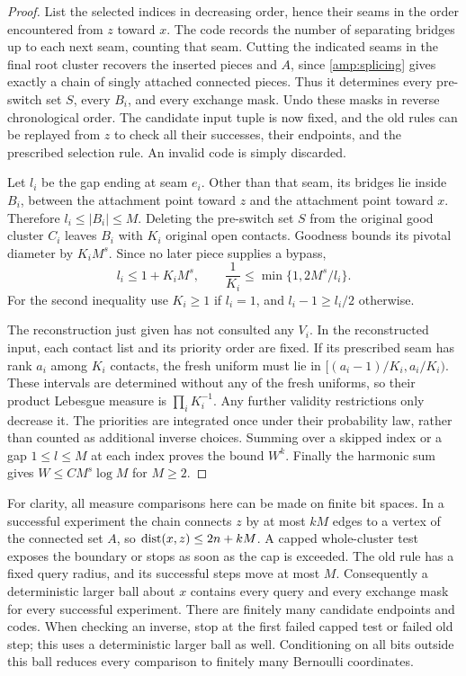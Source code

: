 \begin{proof}
List the selected indices in decreasing order, hence their seams in the
order encountered from $z$ toward $x$.  The code records the number of
separating bridges up to each next seam, counting that seam.  Cutting
the indicated seams in the final root cluster recovers the inserted
pieces and $A$, since \cref{amp:splicing} gives exactly a chain of singly
attached connected pieces.  Thus it determines every pre-switch set
$S$, every $B_i$, and every exchange mask.  Undo these masks in reverse
chronological order.  The candidate input tuple is now fixed, and the
old rules can be replayed from $z$ to check all their successes, their
endpoints, and the prescribed selection rule.  An invalid code is simply
discarded.

Let $l_i$ be the gap ending at seam $e_i$.  Other than that seam, its
bridges lie inside $B_i$, between the attachment point toward $z$ and
the attachment point toward $x$.  Therefore $l_i\le|B_i|\le M$.
Deleting the pre-switch set $S$ from the original good cluster $C_i$
leaves $B_i$ with $K_i$ original open contacts.  Goodness bounds its
pivotal diameter by $K_iM^s$.  Since no later piece supplies a bypass,
\[
 l_i\le1+K_iM^s,
 \qquad
 \frac1{K_i}\le\min\{1,2M^s/l_i\}.
\]
For the second inequality use $K_i\ge1$ if $l_i=1$, and
$l_i-1\ge l_i/2$ otherwise.

The reconstruction just given has not consulted any $V_i$.  In the
reconstructed input, each contact list and its priority order are fixed.
If its prescribed seam has rank $a_i$ among $K_i$ contacts, the fresh
uniform must lie in
$[(a_i-1)/K_i,a_i/K_i)$.  These intervals are determined without any of
the fresh uniforms, so their product Lebesgue measure is
$\prod_iK_i^{-1}$.  Any further validity restrictions only decrease it.
The priorities are integrated once under their probability law, rather
than counted as additional inverse choices.  Summing over a skipped
index or a gap $1\le l\le M$ at each index proves the bound $W^k$.
Finally the harmonic sum gives $W\le C M^s\log M$ for $M\ge2$.
\end{proof}

For clarity, all measure comparisons here can be made on finite bit
spaces.  In a successful experiment the chain connects $z$ by at most
$kM$ edges to a vertex of the connected set $A$, so
$\operatorname{dist}(x,z)\le2n+kM$.  A capped whole-cluster test exposes the boundary
or stops as soon as the cap is exceeded.  The old rule has a fixed query
radius, and its successful steps move at most $M$.  Consequently a
deterministic larger ball about $x$ contains every query and every
exchange mask for every successful experiment.  There are finitely many
candidate endpoints and codes.  When checking an inverse, stop at the
first failed capped test or failed old step; this uses a deterministic
larger ball as well.  Conditioning on all bits outside this ball reduces
every comparison to finitely many Bernoulli coordinates.

